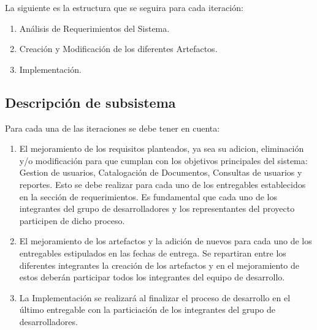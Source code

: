 %
%

La siguiente es la estructura que se seguira para cada iteración:
\begin{enumerate}
        \item Análisis de Requerimientos del Sistema.
        \item Creación y Modificación de los diferentes Artefactos.
        \item Implementación.
\end{enumerate}
        \subsection{Descripción de subsistema}
        Para cada una de las iteraciones se debe tener en cuenta:
        \begin{enumerate}
                \item El mejoramiento de los requisitos planteados, ya sea su adicion, eliminación
                y/o modificación para que cumplan con los objetivos principales del sistema:
                Gestion de usuarios, Catalogación de Documentos, Consultas de usuarios y reportes.
                Esto se debe realizar para cada uno de los entregables establecidos en la sección
                de requerimientos. Es fundamental que cada uno de los integrantes del grupo de
                desarrolladores y los representantes del proyecto participen de dicho proceso.
             
                \item El mejoramiento de los artefactos y la adición de nuevos para cada uno de los
                entregables estipulados en las fechas de entrega. Se repartiran entre los
                diferentes integrantes la creación de los artefactos y en el mejoramiento de estos
                deberán participar todos los integrantes del equipo de desarrollo.
                
                \item La Implementación se realizará al finalizar el proceso de desarrollo en el
                último entregable con la particiación de los integrantes del grupo de 
                desarrolladores.
        \end{enumerate}
        
